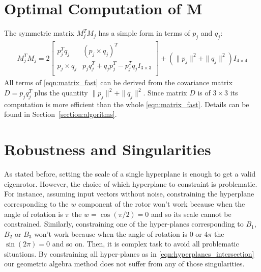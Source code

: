 \documentclass{birkjour}
\numberwithin{equation}{section}
\begin{document}
\section{Optimal Computation of M}

The symmetric matrix $M_j^T M_j$ has a simple form in terms of $p_j$ and $q_j$:
\begin{eqnarray}
   \label{eqn:matrix_fast}
   	M_j^T M_j = 2
	\left[\begin{array}{cc}
		p_j^T q_j       &  (p_j \times q_j)^T \\
		p_j \times q_j  &  p_j q_j^T + q_j p_j^T - p_j^Tq_j I_{3\times3} \\
	\end{array}\right]
    + (\| p_j \|^2 + \| q_j \|^2) I_{4\times4}
\end{eqnarray}
All terms of \ref{eqn:matrix_fast} can be derived from the covariance matrix $D = p_j q_j^T$ plus the quantity $\| p_j \|^2 + \| q_j \|^2$. Since matrix $D$ is of $3\times3$ its computation is more efficient than the whole \ref{eqn:matrix_fast}. Details can be found in Section~\ref{section:algoritms}.

\section{Robustness and Singularities}
\label{section:robustness}

As stated before, setting the scale of a single hyperplane is enough to get a valid eigenrotor. However, the choice of which hyperplane to constraint is problematic. For instance,  assuming input vectors without noise, constraining the hyperplane corresponding to the $w$ component of the rotor won't work because when the angle of rotation is $\pi$ the $w = \cos(\pi/2) = 0$ and so its scale cannot be constrained. Similarly, constraining one of the hyper-planes corresponding to $B_1$, $B_2$ or $B_3$ won't work because when the angle of rotation is $0$ or $4 \pi$ the $\sin(2 \pi) = 0$ and so on. Then, it is complex task to avoid all problematic situations. By constraining all hyper-planes as in \ref{eqn:hyperplanes_intersection} our geometric algebra method does not suffer from any of those singularities.
\end{document}
